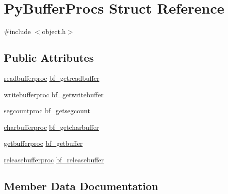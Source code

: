 \hypertarget{struct_py_buffer_procs}{}\section{Py\+Buffer\+Procs Struct Reference}
\label{struct_py_buffer_procs}


{\ttfamily \#include $<$object.\+h$>$}

\subsection*{Public Attributes}
\begin{DoxyCompactItemize}
\item 
\mbox{\hyperlink{_python27_2object_8h_ae0408759caade68a38d4261a98a46f9a}{readbufferproc}} \mbox{\hyperlink{struct_py_buffer_procs_ac4a4a73a136436206f546a481055d31a}{bf\+\_\+getreadbuffer}}
\item 
\mbox{\hyperlink{_python27_2object_8h_ad1d2777d883d3c28a2dd703b1031e1dd}{writebufferproc}} \mbox{\hyperlink{struct_py_buffer_procs_adf412f37383290afb710d364809e1ffa}{bf\+\_\+getwritebuffer}}
\item 
\mbox{\hyperlink{_python27_2object_8h_ab50a170c6a539bf78aa81942369b4653}{segcountproc}} \mbox{\hyperlink{struct_py_buffer_procs_a42e75798b3a2192625e3f7630325d1ae}{bf\+\_\+getsegcount}}
\item 
\mbox{\hyperlink{_python27_2object_8h_a35a0fb030827159d457c4e56551e67c4}{charbufferproc}} \mbox{\hyperlink{struct_py_buffer_procs_a6e2c77a1fd4c1c065410d6f528b78b1f}{bf\+\_\+getcharbuffer}}
\item 
\mbox{\hyperlink{__pygame_8h_aa017fb2160e0b5c8aa3da451f0481384}{getbufferproc}} \mbox{\hyperlink{struct_py_buffer_procs_a082f280ae44aa17f4028a12e58cf77be}{bf\+\_\+getbuffer}}
\item 
\mbox{\hyperlink{__pygame_8h_adfedb341571d379d3146eb4d59019023}{releasebufferproc}} \mbox{\hyperlink{struct_py_buffer_procs_a549a6d721c9ee3d138b92ac495ad59a1}{bf\+\_\+releasebuffer}}
\end{DoxyCompactItemize}


\subsection{Member Data Documentation}
\mbox{\label{struct_py_buffer_procs_a082f280ae44aa17f4028a12e58cf77be}} 
